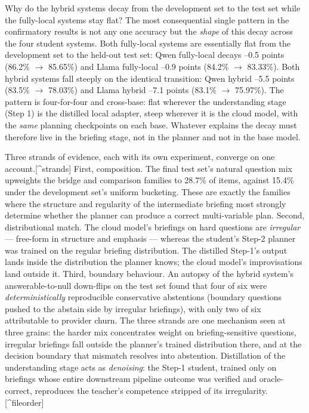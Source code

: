 \documentclass[10pt]{article} %
\begin{document}
Why do the hybrid systems decay from the development set to the test set while the fully-local systems stay flat? The most consequential single pattern in the confirmatory results is not any one accuracy but the \emph{shape} of this decay across the four student systems. Both fully-local systems are essentially flat from the development set to the held-out test set: Qwen fully-local decays --0.5 points (86.2\% $\rightarrow$ 85.65\%) and Llama fully-local --0.9 points (84.2\% $\rightarrow$ 83.33\%). Both hybrid systems fall steeply on the identical transition: Qwen hybrid --5.5 points (83.5\% $\rightarrow$ 78.03\%) and Llama hybrid --7.1 points (83.1\% $\rightarrow$ 75.97\%). The pattern is four-for-four and cross-base: flat wherever the understanding stage (Step 1) is the distilled local adapter, steep wherever it is the cloud model, with the \emph{same} planning checkpoints on each base. Whatever explains the decay must therefore live in the briefing stage, not in the planner and not in the base model.

Three strands of evidence, each with its own experiment, converge on one account.[\^{}strands] First, composition. The final test set's natural question mix upweights the bridge and comparison families to 28.7\% of items, against 15.4\% under the development set's uniform bucketing. These are exactly the families where the structure and regularity of the intermediate briefing most strongly determine whether the planner can produce a correct multi-variable plan. Second, distributional match. The cloud model's briefings on hard questions are \emph{irregular} --- free-form in structure and emphasis --- whereas the student's Step-2 planner was trained on the regular briefing distribution. The distilled Step-1's output lands inside the distribution the planner knows; the cloud model's improvisations land outside it. Third, boundary behaviour. An autopsy of the hybrid system's answerable-to-null down-flips on the test set found that four of six were \emph{deterministically} reproducible conservative abstentions (boundary questions pushed to the abstain side by irregular briefings), with only two of six attributable to provider churn. The three strands are one mechanism seen at three grains: the harder mix concentrates weight on briefing-sensitive questions, irregular briefings fall outside the planner's trained distribution there, and at the decision boundary that mismatch resolves into abstention. Distillation of the understanding stage acts as \emph{denoising}: the Step-1 student, trained only on briefings whose entire downstream pipeline outcome was verified and oracle-correct, reproduces the teacher's competence stripped of its irregularity.[\^{}fileorder]
\end{document}
